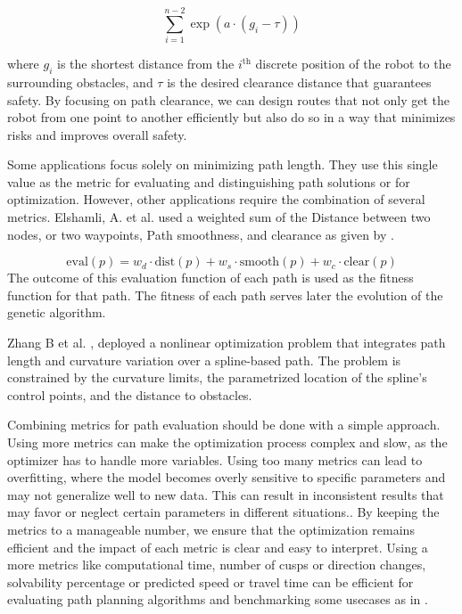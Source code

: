 \begin{equation}
    \sum_{i=1}^{n-2} \exp\left(a \cdot (g_i - \tau)\right)
    \label{clear}
\end{equation}

where \(g_i\) is the shortest distance from the \(i^{\text{th}}\) discrete position of the 
robot to the surrounding obstacles, and \(\tau\) is the desired clearance distance that 
guarantees safety. By focusing 
on path clearance, we can design routes that not only get the robot from one point to another efficiently 
but also do so in a way that minimizes risks and improves overall safety.


Some applications focus solely on minimizing path length. They use this single value as the 
metric for evaluating and distinguishing path solutions or for optimization. However, other 
applications require the combination of several metrics.
Elshamli, A. et al. \cite{R17} used a weighted sum of the Distance between two nodes, or two waypoints,
Path smoothness, and clearance as given by . 

\begin{equation}
    \text{eval}(p) = w_d \cdot \text{dist}(p) + w_s \cdot \text{smooth}(p) + w_c \cdot \text{clear}(p)
    \label{evaluation}
\end{equation}
The outcome of this evaluation function of each path is used as the fitness function for that path.
The fitness of each path serves later the evolution of the genetic algorithm.

Zhang B et al. \cite{R36}, deployed a nonlinear optimization problem that integrates path length and 
curvature variation over a spline-based path. The problem is constrained by the curvature limits, the 
parametrized location of the spline's control points, and the distance to obstacles.

Combining metrics for path evaluation should be done with a simple approach. Using more metrics can make 
the optimization process complex 
and slow, as the optimizer has to handle more variables. Using too many metrics can lead to overfitting, 
where the model becomes overly sensitive to specific parameters and may not generalize well to new data. 
This can result in inconsistent results that may favor or neglect certain parameters in different situations.. 
By keeping the metrics to a 
manageable number, we ensure that the optimization remains efficient and the impact of each metric 
is clear and easy to interpret. 
Using a more metrics like computational time, number of cusps or direction changes, solvability percentage
or predicted speed or travel time can be efficient for evaluating path planning algorithms and benchmarking some
usecases as in \cite{R23}.


